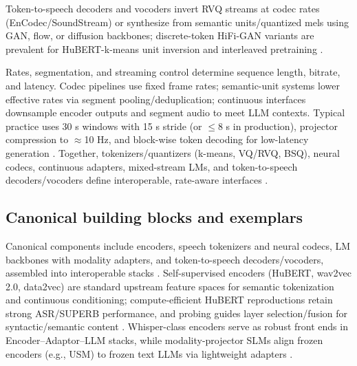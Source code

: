 \documentclass{article}
\begin{document}
Token-to-speech decoders and vocoders invert RVQ streams at codec rates (EnCodec/SoundStream) or synthesize from semantic units/quantized mels using GAN, flow, or diffusion backbones; discrete-token HiFi-GAN variants are prevalent for HuBERT-k-means unit inversion and interleaved pretraining \cite{wang2025tadicodectextawarediffusionspeechtokeniz,zeng2024scalingspeechtextpretrainingsyntheticint}.

Rates, segmentation, and streaming control determine sequence length, bitrate, and latency. Codec pipelines use fixed frame rates; semantic-unit systems lower effective rates via segment pooling/deduplication; continuous interfaces downsample encoder outputs and segment audio to meet LLM contexts. Typical practice uses 30 s windows with 15 s stride (or $\leq$8 s in production), projector compression to $\approx$10 Hz, and block-wise token decoding for low-latency generation \cite{nguyen2025qwenvsgemmaintegrationwhispercomparative,li2025seewossubmissionmlcslmlessonslearnedspee,zeng2024scalingspeechtextpretrainingsyntheticint}. Together, tokenizers/quantizers (k-means, VQ/RVQ, BSQ), neural codecs, continuous adapters, mixed-stream LMs, and token-to-speech decoders/vocoders define interoperable, rate-aware interfaces \cite{guo2025recentadvancesdiscretespeechtokensreview}.

\subsection{Canonical building blocks and exemplars} \label{subsec:canonicalbuildingblocksandexemplars}
Canonical components include encoders, speech tokenizers and neural codecs, LM backbones with modality adapters, and token-to-speech decoders/vocoders, assembled into interoperable stacks \cite{guo2025recentadvancesdiscretespeechtokensreview}. Self-supervised encoders (HuBERT, wav2vec 2.0, data2vec) are standard upstream feature spaces for semantic tokenization and continuous conditioning; compute-efficient HuBERT reproductions retain strong ASR/SUPERB performance, and probing guides layer selection/fusion for syntactic/semantic content \cite{chen2023reducingbarriersselfsupervisedlearninghu,shen2023wavesyntaxprobingspokenlanguagemodels}. Whisper-class encoders serve as robust front ends in Encoder--Adaptor--LLM stacks, while modality-projector SLMs align frozen encoders (e.g., USM) to frozen text LLMs via lightweight adapters \cite{wang2023slmbridgethingapbetweenspeechtextfoundat,nguyen2025qwenvsgemmaintegrationwhispercomparative,guo2025recentadvancesdiscretespeechtokensreview}.
\end{document}
